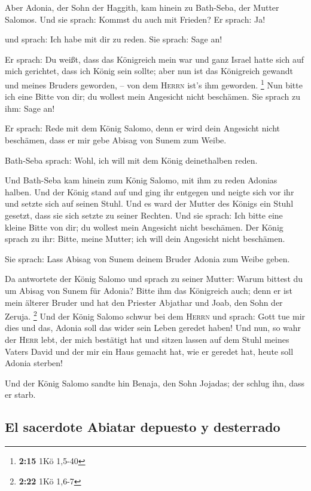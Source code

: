  Aber Adonia, der Sohn der Haggith, kam hinein zu
Bath-Seba, der Mutter Salomos. Und sie sprach: Kommst du auch mit
Frieden? Er sprach: Ja!

 und sprach: Ich habe mit dir zu reden. Sie sprach: Sage
an!

 Er sprach: Du weißt, dass das Königreich mein war und
ganz Israel hatte sich auf mich gerichtet, dass ich König sein sollte;
aber nun ist das Königreich gewandt und meines Bruders geworden, -- von
dem \textsc{Herrn} ist's ihm geworden. \footnote{\textbf{2:15} 1Kö
  1,5-40}  Nun bitte ich eine Bitte von dir; du wollest
mein Angesicht nicht beschämen. Sie sprach zu ihm: Sage an!

 Er sprach: Rede mit dem König Salomo, denn er wird dein
Angesicht nicht beschämen, dass er mir gebe Abisag von Sunem zum Weibe.

 Bath-Seba sprach: Wohl, ich will mit dem König
deinethalben reden.

 Und Bath-Seba kam hinein zum König Salomo, mit ihm zu
reden Adonias halben. Und der König stand auf und ging ihr entgegen und
neigte sich vor ihr und setzte sich auf seinen Stuhl. Und es ward der
Mutter des Königs ein Stuhl gesetzt, dass sie sich setzte zu seiner
Rechten.  Und sie sprach: Ich bitte eine kleine Bitte von
dir; du wollest mein Angesicht nicht beschämen. Der König sprach zu ihr:
Bitte, meine Mutter; ich will dein Angesicht nicht beschämen.

 Sie sprach: Lass Abisag von Sunem deinem Bruder Adonia
zum Weibe geben.

 Da antwortete der König Salomo und sprach zu seiner
Mutter: Warum bittest du um Abisag von Sunem für Adonia? Bitte ihm das
Königreich auch; denn er ist mein älterer Bruder und hat den Priester
Abjathar und Joab, den Sohn der Zeruja. \footnote{\textbf{2:22} 1Kö
  1,6-7}  Und der König Salomo schwur bei dem
\textsc{Herrn} und sprach: Gott tue mir dies und das, Adonia soll das
wider sein Leben geredet haben!  Und nun, so wahr der
\textsc{Herr} lebt, der mich bestätigt hat und sitzen lassen auf dem
Stuhl meines Vaters David und der mir ein Haus gemacht hat, wie er
geredet hat, heute soll Adonia sterben!

 Und der König Salomo sandte hin Benaja, den Sohn
Jojadas; der schlug ihn, dass er starb.

\hypertarget{el-sacerdote-abiatar-depuesto-y-desterrado}{%
\subsection{El sacerdote Abiatar depuesto y
desterrado}\label{el-sacerdote-abiatar-depuesto-y-desterrado}}

